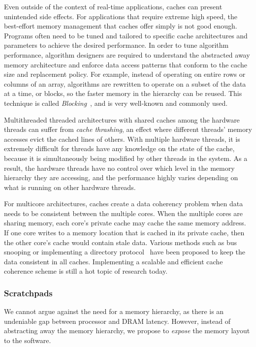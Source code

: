 Even outside of the context of real-time applications, caches can present unintended side effects.
For applications that require extreme high speed, the best-effort memory management that caches offer simply is not good enough.
Programs often need to be tuned and tailored to specific cache architectures and parameters to achieve the desired performance. 
In order to tune algorithm performance, algorithm designers are required to understand the abstracted away memory architecture and enforce data access patterns that conform to the cache size and replacement policy.   
For example, instead of operating on entire rows or columns of an array, algorithms are rewritten to operate on a subset of the data at a time, or blocks, so the faster memory in the hierarchy can be reused.
This technique is called \emph{Blocking}~\cite{Lam91thecache}, and is very well-known and commonly used.   

Multithreaded threaded architectures with shared caches among the hardware threads can suffer from \emph{cache thrashing}, an effect where different threads' memory accesses evict the cached lines of others.
With multiple hardware threads, it is extremely difficult for threads have any knowledge on the state of the cache, because it is simultaneously being modified by other threads in the system. 
As a result, the hardware threads have no control over which level in the memory hierarchy they are accessing, and the performance highly varies depending on what is running on other hardware threads. 

For multicore architectures, caches create a data coherency problem when data needs to be consistent between the multiple cores.
When the multiple cores are sharing memory, each core's private cache may cache the same memory address. 
If one core writes to a memory location that is cached in its private cache, then the other core's cache would contain stale data. 
Various methods such as bus snooping or implementing a directory protocol~\cite{Stenstrom:1990:SCC:79809.79810} have been proposed to keep the data consistent in all caches. 
Implementing a scalable and efficient cache coherence scheme is still a hot topic of research today.

\subsubsection{Scratchpads}
We cannot argue against the need for a memory hierarchy, as there is an undeniable gap between processor and DRAM latency.
However, instead of abstracting away the memory hierarchy, we propose to \emph{expose} the memory layout to the software.  

